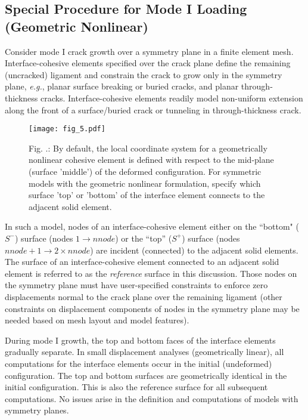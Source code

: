 \documentclass[11pt]{report}
\numberwithin{equation}{section}
\newcommand{\eg}{\emph{e.g.},\xspace}
\newcommand{\ti}{\emph}
\renewcommand{\thefigure}{\thesection.\arabic{figure}}
\begin{document}
\subsection{Special Procedure for Mode I Loading (Geometric Nonlinear)}
Consider mode I crack growth over a symmetry plane in a 
finite element mesh. Interface-cohesive elements specified over the crack 
plane define the remaining (uncracked) ligament and constrain 
the crack to grow only in the symmetry plane, \eg planar surface breaking or
buried cracks, and planar through-thickness cracks. Interface-cohesive elements
readily model non-uniform extension along the front of a surface/buried crack or
tunneling in through-thickness  crack.

%
\begin{figure}[htb]  
\begin{center}
\texttt{[image: fig\_5.pdf]} 
\caption{{\small Fig. \thefigure: By default, the local coordinate 
system for a geometrically nonlinear cohesive element 
is defined with respect to the mid-plane (surface 'middle') of the deformed 
configuration. For
symmetric models with the geometric nonlinear formulation, specify
which surface 'top' or 'bottom' of the interface element connects to the
adjacent solid element. }\label{fig:top_bottom_def}}
%
\end{center}
\end{figure}

In such a model, nodes of an interface-cohesive element either 
on the ``bottom" ( $S^-$) surface (nodes $1\rightarrow nnode$) or the
``top'' ($S^+$) surface (nodes 
$nnode+1 \rightarrow  2 \times nnode$) are incident (connected)
to the adjacent solid elements. The surface of an interface-cohesive
element connected to an adjacent solid element is referred to  
as the \ti{reference}
surface in this discussion.
Those nodes on the symmetry plane 
must have user-specified constraints to enforce zero displacements 
normal to the crack plane over the remaining ligament (other constraints on 
displacement components of nodes in the symmetry
plane may be needed based on mesh layout and model features).

During mode I growth, the top and bottom faces of the interface elements 
gradually separate. In small displacement analyses (geometrically
linear), all computations for 
the interface elements occur in the initial (undeformed) configuration. The 
top and bottom surfaces are geometrically identical in the initial
configuration. This is also the reference surface for all subsequent 
computations.  No issues arise in the definition and
computations of models with symmetry planes. 
\end{document}
